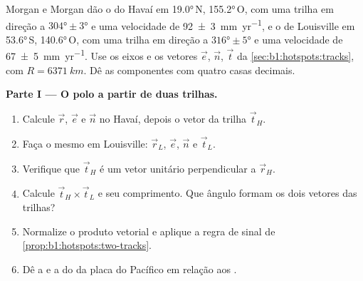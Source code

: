 \begin{problem}
\label{pb:b1:hotspots:1}
Morgan e Morgan dão o  do Havaí em \ang{19.0}\,N, \ang{155.2}\,O, com uma trilha em direção a $\ang{304}\pm\ang{3}$ e uma velocidade de \qty[uncertainty-mode=separate]{92 \pm 3}{mm.yr^{-1}}, e o  de Louisville em \ang{53.6}\,S, \ang{140.6}\,O, com uma trilha em direção a $\ang{316}\pm\ang{5}$ e uma velocidade de \qty[uncertainty-mode=separate]{67 \pm 5}{mm.yr^{-1}}. Use os eixos e os vetores $\vec e$, $\vec n$, $\vec t$ da \cref{sec:b1:hotspots:tracks}, com $R = \qty{6371}{km}$. Dê as componentes com quatro casas decimais.

\medskip
\noindent\textbf{Parte I --- O polo a partir de duas trilhas.}
\begin{enumerate}
  \item Calcule $\vec r$, $\vec e$ e $\vec n$ no Havaí, depois o vetor da trilha
        $\vec t_H$.
  \item Faça o mesmo em Louisville: $\vec r_L$, $\vec e$, $\vec n$ e
        $\vec t_L$.
  \item Verifique que $\vec t_H$ é um vetor unitário perpendicular a $\vec r_H$.
  \item Calcule $\vec t_H\times\vec t_L$ e seu comprimento. Que ângulo formam os dois vetores das trilhas?
  \item Normalize o produto vetorial e aplique a regra de sinal de
        \cref{prop:b1:hotspots:two-tracks}.
  \item Dê a  e a  do  da placa do Pacífico em relação aos .
\end{enumerate}


\end{problem}
